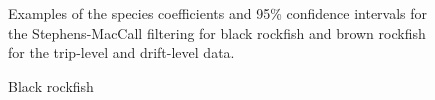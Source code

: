 \documentclass[
  12pt,
  authoryear,
  preprint,
  3p]{elsarticle}
\begin{document}
\begin{figure}
\begin{minipage}[t]{0.50\linewidth}
{{}

}

\end{minipage}%

\caption{\label{fig-sm}Examples of the species coefficients and 95\%
confidence intervals for the Stephens-MacCall filtering for black
rockfish and brown rockfish for the trip-level and drift-level data.}

\end{figure}

\begin{figure}

\begin{minipage}[t]{0.50\linewidth}

{\centering 


\caption{\label{fig-black-indices}Black rockfish}

}

\end{minipage}%
%
\begin{minipage}[t]{0.50\linewidth}

{\centering 

}
\end{minipage}
\end{figure}
\end{document}
